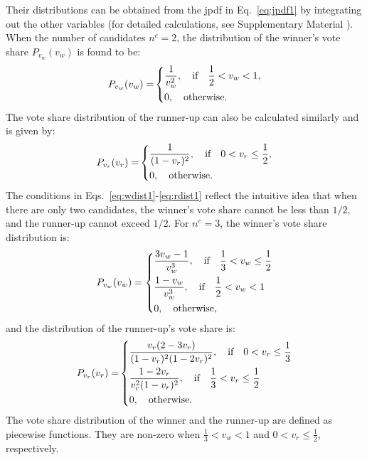 Their distributions can be obtained from the jpdf in Eq.~\ref{eq:jpdf1} by integrating out the other variables (for detailed calculations, see Supplementary Material \cite{supp}). When the number of candidates $n^c = 2$, the distribution of the winner's vote share $P_{v_w}(v_w)$ is found to be:
\begin{equation}
{P_{v_w}(v_w) = }
\begin{dcases}
     \frac{1}{v_w^2}, ~~\text{ if } ~~ \frac{1}{2} < v_w < 1,\\
     0, ~~\text{ otherwise}.
\end{dcases}
\label{eq:wdist1}
\end{equation}
The vote share distribution of the runner-up can also be calculated similarly and is given by:
\begin{equation}
{P_{v_r}(v_r) = }
\begin{dcases}
     \frac{1}{(1- v_r)^2}, ~~\text{ if } ~~ 0 < v_r \leq \frac{1}{2},\\
     0, ~~\text{ otherwise}.
\end{dcases}
\label{eq:rdist1}
\end{equation}
The conditions in Eqs.~\ref{eq:wdist1}-\ref{eq:rdist1} reflect the intuitive idea that when there are only two candidates, the winner's vote share cannot be less than $1/2$, and the runner-up cannot exceed $1/2$. For $n^c = 3$, the winner's vote share distribution is:
\begin{equation}
P_{v_w}(v_w) = 
\begin{dcases}
     \frac{3v_w - 1}{ v_w^3}, ~~\text{ if } ~~\frac{1}{3} < v_w \leq \frac{1}{2}\\
     \frac{1 - v_w}{v_w^3}, ~~\text{ if } ~~\frac{1}{2} < v_w < 1\\
     0, ~~\text{ otherwise},
\end{dcases}
\end{equation}
and the distribution of the runner-up's vote share is:
\begin{equation}
{P_{v_r}(v_r) = }
\begin{dcases}
    \frac{v_r (2 - 3 v_r)}{(1 - v_r)^2 (1 - 2 v_r)^2}, ~~\text{ if } ~~ 0 < v_r \leq \frac{1}{3}\\
    \frac{1 - 2 v_r}{v_r^2(1 - v_r)^2}, ~~\text{ if } ~~ \frac{1}{3} < v_r \leq \frac{1}{2}\\
     0, ~~ \text{ otherwise}.
\end{dcases}
\end{equation}
The vote share distribution of the winner and the runner-up are defined as piecewise functions. They are non-zero when $\frac{1}{3} < v_w < 1$ and $0 < v_r \leq \frac{1}{2}$, respectively.
